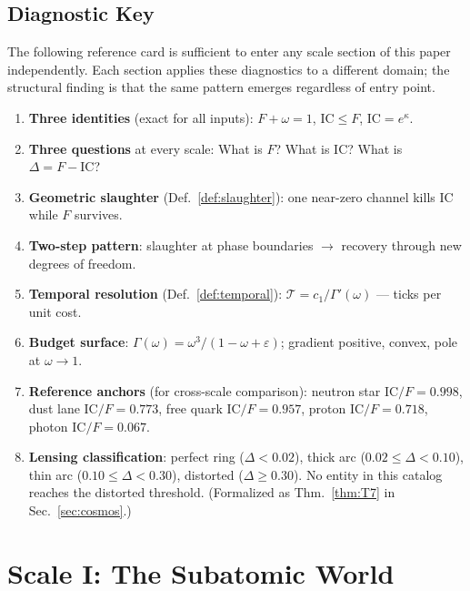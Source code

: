 \documentclass[
  aps,
  prd,
  twocolumn,
  superscriptaddress,
  nofootinbib,
  floatfix
]{revtex4-2}
\newcommand{\Gam}{\Gamma}
\newcommand{\eps}{\varepsilon}
\newcommand{\IC}{\mathrm{IC}}
\begin{document}
\subsection{Diagnostic Key}\label{sec:key}

The following reference card is sufficient to enter any scale
section of this paper independently.  Each section applies
these diagnostics to a different domain; the structural
finding is that the same pattern emerges regardless of entry
point.

\begin{enumerate}
\item \textbf{Three identities} (exact for all inputs):
  $F + \omega = 1$, \; $\IC \leq F$, \; $\IC = e^{\kappa}$.
\item \textbf{Three questions} at every scale:
  What is $F$?  What is $\IC$?  What is $\Delta = F - \IC$?
\item \textbf{Geometric slaughter}
  (Def.~\ref{def:slaughter}):
  one near-zero channel kills $\IC$ while $F$ survives.
\item \textbf{Two-step pattern}: slaughter at phase
  boundaries $\to$ recovery through new degrees of freedom.
\item \textbf{Temporal resolution}
  (Def.~\ref{def:temporal}):
  $\mathcal{T} = c_1/\Gam'(\omega)$ --- ticks per unit cost.
\item \textbf{Budget surface}: $\Gam(\omega)
  = \omega^3/(1 - \omega + \eps)$; gradient positive, convex,
  pole at $\omega \to 1$.
\item \textbf{Reference anchors} (for cross-scale comparison):
  neutron star $\IC/F = 0.998$, dust lane $\IC/F = 0.773$,
  free quark $\IC/F = 0.957$, proton $\IC/F = 0.718$,
  photon $\IC/F = 0.067$.
\item \textbf{Lensing classification}:
  perfect ring ($\Delta < 0.02$), thick arc
  ($0.02 \leq \Delta < 0.10$), thin arc
  ($0.10 \leq \Delta < 0.30$), distorted ($\Delta \geq 0.30$).
  No entity in this catalog reaches the distorted threshold.
  (Formalized as Thm.~\ref{thm:T7} in Sec.~\ref{sec:cosmos}.)
\end{enumerate}


\section{Scale I: The Subatomic World}\label{sec:subatomic}
\end{document}
